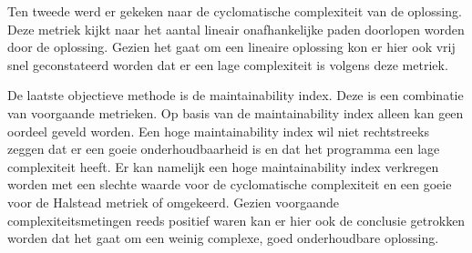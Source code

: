 Ten tweede werd er gekeken naar de cyclomatische complexiteit van de oplossing. Deze metriek kijkt naar het aantal lineair onafhankelijke paden doorlopen worden door de oplossing. Gezien het gaat om een lineaire oplossing kon er hier ook vrij snel geconstateerd worden dat er een lage complexiteit is volgens deze metriek. 

De laatste objectieve methode is de maintainability index. Deze is een combinatie van voorgaande metrieken. Op basis van de maintainability index alleen kan geen oordeel geveld worden. Een hoge maintainability index wil niet rechtstreeks zeggen dat er een goeie onderhoudbaarheid is en dat het programma een lage complexiteit heeft. Er kan namelijk een hoge maintainability index verkregen worden met een slechte waarde voor de cyclomatische complexiteit en een goeie voor de Halstead metriek of omgekeerd. Gezien voorgaande complexiteitsmetingen reeds positief waren kan er hier ook de conclusie getrokken worden dat het gaat om een weinig complexe, goed onderhoudbare oplossing.


